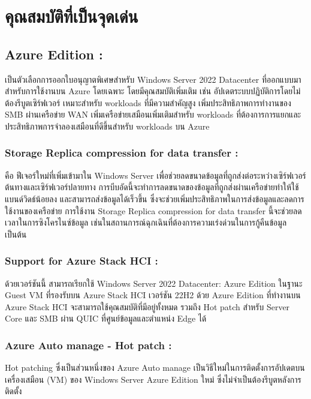 \section{คุณสมบัติที่เป็นจุดเด่น}

\hspace{0cm}\subsection{Azure Edition :}เป็นตัวเลือกการออกใบอนุญาตพิเศษสำหรับ Windows Server 2022 Datacenter ที่ออกแบบมาสำหรับการใช้งานบน Azure โดยเฉพาะ
โดยมีคุณสมบัติเพิ่มเติม เช่น อัปเดตระบบปฏิบัติการโดยไม่ต้องรีบูตเซิร์ฟเวอร์ เหมาะสำหรับ workloads ที่มีความสำคัญสูง เพิ่มประสิทธิภาพการทำงานของ SMB ผ่านเครือข่าย WAN เพิ่มเครือข่ายเสมือนเพิ่มเติมสำหรับ workloads ที่ต้องการการแยกและประสิทธิภาพการจำลองเสมือนที่ดีขึ้นสำหรับ workloads บน Azure \cite{2022:3}

\hspace{1cm}\subsubsection{Storage Replica compression for data transfer :}คือ ฟีเจอร์ใหม่ที่เพิ่มเข้ามาใน Windows Server เพื่อช่วยลดขนาดข้อมูลที่ถูกส่งต่อระหว่างเซิร์ฟเวอร์ต้นทางและเซิร์ฟเวอร์ปลายทาง การบีบอัดนี้จะทำการลดขนาดของข้อมูลที่ถูกส่งผ่านเครือข่ายทำให้ใช้แบนด์วิดธ์น้อยลง และสามารถส่งข้อมูลได้เร็วขึ้น ซึ่งจะช่วยเพิ่มประสิทธิภาพในการส่งข้อมูลและลดการใช้งานของเครือข่าย การใช้งาน Storage Replica compression for data transfer นี้จะช่วยลดเวลาในการซิงโครไนซ์ข้อมูล เช่นในสถานการณ์ฉุกเฉินที่ต้องการความเร่งด่วนในการกู้คืนข้อมูล เป็นต้น

\hspace{1cm}\subsubsection{Support for Azure Stack HCI :}ด้วยเวอร์ชันนี้ สามารถเรียกใช้ Windows Server 2022 Datacenter: Azure Edition ในฐานะ Guest VM ที่รองรับบน Azure Stack HCI เวอร์ชัน 22H2 ด้วย Azure Edition ที่ทำงานบน Azure Stack HCI จะสามารถใช้คุณสมบัติที่มีอยู่ทั้งหมด รวมถึง Hot patch สำหรับ Server Core และ SMB ผ่าน QUIC ที่ศูนย์ข้อมูลและตำแหน่ง Edge ได้

\hspace{1cm}\subsubsection{Azure Auto manage - Hot patch :}Hot patching ซึ่งเป็นส่วนหนึ่งของ Azure Auto manage เป็นวิธีใหม่ในการติดตั้งการอัปเดตบนเครื่องเสมือน (VM) ของ Windows Server Azure Edition ใหม่ ซึ่งไม่จำเป็นต้องรีบูตหลังการติดตั้ง 

